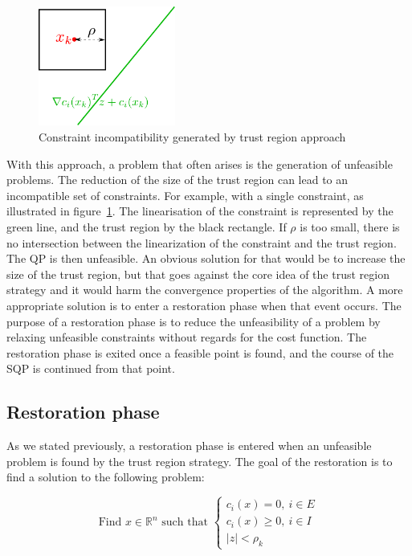 \begin{figure}
  \centering
  \includegraphics[width=0.4\textwidth]{trust_region_incompatible.pdf}
  \caption{Constraint incompatibility generated by trust region approach}
\label{fig:TR_incompatible}
\end{figure}

With this approach, a problem that often arises is the generation of unfeasible problems.
The reduction of the size of the trust region can lead to an incompatible set of constraints.
For example, with a single constraint, as illustrated in figure~\ref{fig:TR_incompatible}.
The linearisation of the constraint is represented by the green line, and the trust region by the black rectangle.
If $\rho$ is too small, there is no intersection between the linearization of the constraint and the trust region.
The QP is then unfeasible.
An obvious solution for that would be to increase the size of the trust region, but that goes against the core idea of the trust region strategy and it would harm the convergence properties of the algorithm.
A more appropriate solution is to enter a restoration phase when that event occurs.
The purpose of a restoration phase is to reduce the unfeasibility of a problem by relaxing unfeasible constraints without regards for the cost function.
The restoration phase is exited once a feasible point is found, and the course of the SQP is continued from that point.

\subsection{Restoration phase}
\label{sub:restoration_phase}

As we stated previously, a restoration phase is entered when an unfeasible problem is found by the trust region strategy.
The goal of the restoration is to find a solution to the following problem:

\begin{equation}
    \text{Find $x\in\mathbb{R}^n$ such that }
    \left\{
    \begin{array}{l}
      c_i(x)=0,\ i\in E \\
      c_i(x)\geq 0,\ i\in I\\
      |z|<\rho_k
    \end{array}
    \right.
\label{eq:resto_NL}
\end{equation}


